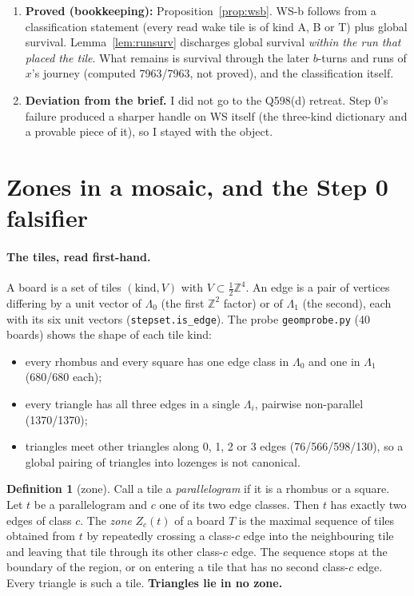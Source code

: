 \documentclass[11pt]{article}
\theoremstyle{definition}\newtheorem{definition}[theorem]{Definition}\newtheorem{remark}[theorem]{Remark}
\begin{document}
\begin{enumerate}
\item \textbf{Proved (bookkeeping):} Proposition~\ref{prop:wsb}. WS-b follows from a classification statement (every read wake tile is of kind A, B or T) plus global survival. Lemma~\ref{lem:runsurv} discharges global survival \emph{within the run that placed the tile}. What remains is survival through the later $b$-turns and runs of $x$'s journey (computed 7963/7963, not proved), and the classification itself.
\item \textbf{Deviation from the brief.} I did not go to the Q598(d) retreat. Step 0's failure produced a sharper handle on WS itself (the three-kind dictionary and a provable piece of it), so I stayed with the object.
\end{enumerate}

\section{Zones in a mosaic, and the Step 0 falsifier}\label{sec:zone}
\paragraph{The tiles, read first-hand.} A board is a set of tiles $(\mathrm{kind},V)$ with $V\subset\tfrac12\mathbb Z^4$. An edge is a pair of vertices differing by a unit vector of $\Lambda_0$ (the first $\mathbb Z^2$ factor) or of $\Lambda_1$ (the second), each with its six unit vectors (\texttt{stepset.is\_edge}).
The probe \texttt{geomprobe.py} (40 boards) shows the shape of each tile kind:
\begin{itemize}
\item every rhombus and every square has one edge class in $\Lambda_0$ and one in $\Lambda_1$ (680/680 each);
\item every triangle has all three edges in a single $\Lambda_i$, pairwise non-parallel (1370/1370);
\item triangles meet other triangles along 0, 1, 2 or 3 edges (76/566/598/130), so a global pairing of triangles into lozenges is not canonical.
\end{itemize}

\begin{definition}[zone]\label{def:zone}
Call a tile a \emph{parallelogram} if it is a rhombus or a square. Let $t$ be a parallelogram and $c$ one of its two edge classes. Then $t$ has exactly two edges of class $c$.
The \emph{zone} $Z_c(t)$ of a board $T$ is the maximal sequence of tiles obtained from $t$ by repeatedly crossing a class-$c$ edge into the neighbouring tile and leaving that tile through its other class-$c$ edge.
The sequence stops at the boundary of the region, or on entering a tile that has no second class-$c$ edge. Every triangle is such a tile. \textbf{Triangles lie in no zone.}
\end{definition}
\end{document}
